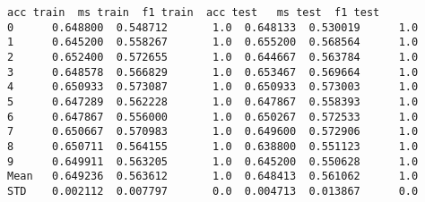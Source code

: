 \lstset{style=codestyle, language=Python}
\begin{lstlisting}[frame=single]
      acc train  ms train  f1 train  acc test   ms test  f1 test
0      0.648800  0.548712       1.0  0.648133  0.530019      1.0
1      0.645200  0.558267       1.0  0.655200  0.568564      1.0
2      0.652400  0.572655       1.0  0.644667  0.563784      1.0
3      0.648578  0.566829       1.0  0.653467  0.569664      1.0
4      0.650933  0.573087       1.0  0.650933  0.573003      1.0
5      0.647289  0.562228       1.0  0.647867  0.558393      1.0
6      0.647867  0.556000       1.0  0.650267  0.572533      1.0
7      0.650667  0.570983       1.0  0.649600  0.572906      1.0
8      0.650711  0.564155       1.0  0.638800  0.551123      1.0
9      0.649911  0.563205       1.0  0.645200  0.550628      1.0
Mean   0.649236  0.563612       1.0  0.648413  0.561062      1.0
STD    0.002112  0.007797       0.0  0.004713  0.013867      0.0
\end{lstlisting}
